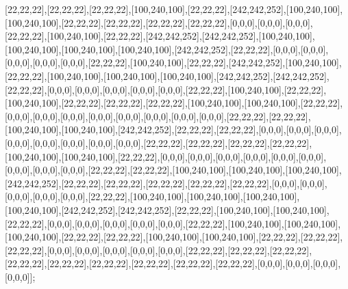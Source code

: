 [22,22,22],[22,22,22],[22,22,22],[100,240,100],[22,22,22],[242,242,252],[100,240,100],[100,240,100],[22,22,22],[22,22,22],[22,22,22],[22,22,22],[0,0,0],[0,0,0],[0,0,0],[22,22,22],[100,240,100],[22,22,22],[242,242,252],[242,242,252],[100,240,100],[100,240,100],[100,240,100],[100,240,100],[242,242,252],[22,22,22],[0,0,0],[0,0,0],[0,0,0],[0,0,0],[0,0,0],[22,22,22],[100,240,100],[22,22,22],[242,242,252],[100,240,100],[22,22,22],[100,240,100],[100,240,100],[100,240,100],[242,242,252],[242,242,252],[22,22,22],[0,0,0],[0,0,0],[0,0,0],[0,0,0],[0,0,0],[22,22,22],[100,240,100],[22,22,22],[100,240,100],[22,22,22],[22,22,22],[22,22,22],[100,240,100],[100,240,100],[22,22,22],[0,0,0],[0,0,0],[0,0,0],[0,0,0],[0,0,0],[0,0,0],[0,0,0],[0,0,0],[22,22,22],[22,22,22],[100,240,100],[100,240,100],[242,242,252],[22,22,22],[22,22,22],[0,0,0],[0,0,0],[0,0,0],[0,0,0],[0,0,0],[0,0,0],[0,0,0],[0,0,0],[22,22,22],[22,22,22],[22,22,22],[22,22,22],[100,240,100],[100,240,100],[22,22,22],[0,0,0],[0,0,0],[0,0,0],[0,0,0],[0,0,0],[0,0,0],[0,0,0],[0,0,0],[0,0,0],[22,22,22],[22,22,22],[100,240,100],[100,240,100],[100,240,100],[242,242,252],[22,22,22],[22,22,22],[22,22,22],[22,22,22],[22,22,22],[0,0,0],[0,0,0],[0,0,0],[0,0,0],[0,0,0],[22,22,22],[100,240,100],[100,240,100],[100,240,100],[100,240,100],[242,242,252],[242,242,252],[22,22,22],[100,240,100],[100,240,100],[22,22,22],[0,0,0],[0,0,0],[0,0,0],[0,0,0],[0,0,0],[22,22,22],[100,240,100],[100,240,100],[100,240,100],[22,22,22],[22,22,22],[100,240,100],[100,240,100],[22,22,22],[22,22,22],[22,22,22],[0,0,0],[0,0,0],[0,0,0],[0,0,0],[0,0,0],[22,22,22],[22,22,22],[22,22,22],[22,22,22],[22,22,22],[22,22,22],[22,22,22],[22,22,22],[22,22,22],[0,0,0],[0,0,0],[0,0,0],[0,0,0]];

